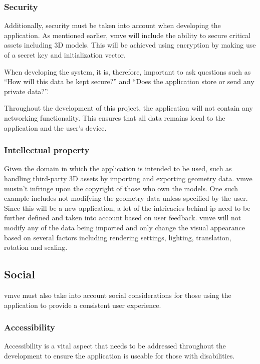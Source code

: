 \documentclass[11pt]{article}
\begin{document}
\subsubsection{Security}
Additionally, security must be taken into account when developing the
application. As mentioned earlier, \gls*{vmve} will include the ability to secure
critical assets including 3D models. This will be achieved using encryption by
making use of a secret key and initialization vector.

When developing the system, it is, therefore, important to ask questions such as
``How will this data be kept secure?'' and ``Does the application store or send
any private data?''. 

Throughout the development of this project, the application will not contain any
networking functionality. This ensures that all data remains local to the
application and the user's device.

\subsubsection{Intellectual property}
Given the domain in which the application is intended to be used, such as
handling third-party 3D assets by importing and exporting geometry data.
\gls*{vmve} mustn't infringe upon the copyright of those who own the models. One
such example includes not modifying the geometry data unless specified by the
user. Since this will be a new application, a lot of the intricacies behind
\gls*{ip} need to be further defined and taken into account based on user
feedback. \gls*{vmve} will not modify any of the data being imported and only
change the visual appearance based on several factors including rendering
settings, lighting, translation, rotation and scaling. 

\subsection{Social}
\gls*{vmve} must also take into account social considerations for those using the
application to provide a consistent user experience.

\subsubsection{Accessibility}
Accessibility is a vital aspect that needs to be addressed throughout the
development to ensure the application is useable for those with disabilities.
\end{document}
